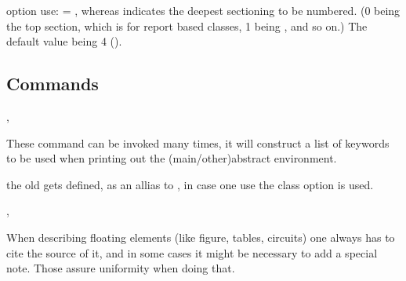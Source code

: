 \documentclass[article,nofontwarning,nogeometry,english,tocdepth=3,secdepth=3]{ufrgscca} %
\begin{document}
\begin{describelist}{option}
	 {use:  = , whereas  indicates the deepest sectioning to be numbered. (0 being the top section, which is \tsmacro{\chapter}{} for report based classes, 1 being \tsmacro{\section}{}, and so on.) The default value being 4 (\tsmacro{\paragraph}{}).}

\end{describelist}


\subsection{Commands}

\begin{codedescribe}[code,new=2023/11/18]{\mainkeyword,\otherkeyword}
	\begin{codesyntax}%
	\end{codesyntax}
  These command can be invoked many times, it will construct a list of keywords  to be used when printing out the (main/other)abstract environment.
\end{codedescribe}
\begin{tsremark}
  the old  gets defined, as an allias to \tsobj{\mainkeyword}, in case one use the  class option is used.
\end{tsremark}

\begin{codedescribe}{\sourcecitation,\note}
	\begin{codesyntax}
		\tsmacro{\sourcecitation}{source}
		\tsmacro{\note}{text}
	\end{codesyntax}
When describing floating elements (like figure, tables, circuits) one always has to cite the source of it, and in some cases it might be necessary to add a special note. Those assure uniformity when doing that.
\end{codedescribe}
\end{document}
